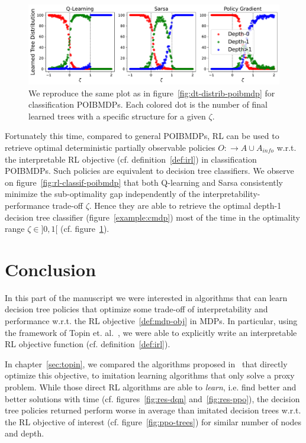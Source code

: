 \begin{figure}
    \centering
    \includegraphics[width=1\textwidth]{images/images_part1/tree_distributions_classif.pdf}
    \caption{We reproduce the same plot as in figure~\ref{fig:dt-distrib-poibmdp} for classification POIBMDPs. Each colored dot is the number of final learned trees with a specific structure for a given $\zeta$.}\label{fig:tree-distrib-classif-poibmdp}
\end{figure}

Fortunately this time, compared to general POIBMDPs, RL can be used to retrieve optimal deterministic partially observable policies $O:\rightarrow A\cup A_{info}$ w.r.t. the interpretable RL objective (cf. definition~\ref{def:irl}) in classification POIBMDPs.
Such policies are equivalent to decision tree classifiers.
We observe on figure~\ref{fig:rl-classif-poibmdp} that both Q-learning and Sarsa consistently minimize the sub-optimality gap independently of the interpretability-performance trade-off $\zeta$. 
Hence they are able to retrieve the optimal depth-1 decision tree classifier (figure~\ref{example:cmdp}) most of the time in the optimality range $\zeta\in ]0, 1[$ (cf. figure~\ref{fig:tree-distrib-classif-poibmdp}).


\section{Conclusion}\label{sec:ccl-pomdp}
In this part of the manuscript we were interested in algorithms that can learn decision tree policies that optimize some trade-off of interpretability and performance w.r.t. the RL objective~\ref{def:mdp-obj} in MDPs.
In particular, using the framework of Topin et. al.~\cite{topin2021iterative}, we were able to explicitly write an interpretable RL objective function (cf. definition~\ref{def:irl}).

In chapter~\ref{sec:topin}, we compared the algorithms proposed in~\cite{topin2021iterative} that directly optimize this objective, to imitation learning algorithms that only solve a proxy problem.
While those direct RL algorithms are able to \textit{learn}, i.e. find better and better solutions with time (cf. figures~\ref{fig:res-dqn} and~\ref{fig:res-ppo}), the decision tree policies returned perform worse in average than imitated decision trees w.r.t. the RL objective of interest (cf. figure~\ref{fig:ppo-trees}) for similar number of nodes and depth.

